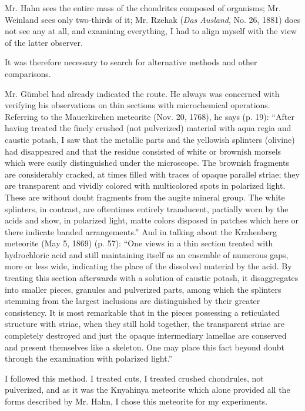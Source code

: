 \documentclass[a4paper, 12pt, oneside]{article}
\begin{document}
Mr. Hahn sees the entire mass of the chondrites composed of organisms; Mr. Weinland sees only two-thirds of it; Mr. Rzehak (\emph{Das Ausland}, No. 26, 1881) does not see any at all, and examining everything, I had to align myself with the view of the latter observer.

It was therefore necessary to search for alternative methods and other comparisons.

Mr. Gümbel had already indicated the route. He always was concerned with verifying his observations on thin sections with microchemical operations. Referring to the Mauerkirchen meteorite (Nov. 20, 1768), he says (p. 19): ``After having treated the finely crushed (not pulverized) material with aqua regia and caustic potash, I saw that the metallic parts and the yellowish splinters (olivine) had disappeared and that the residue consisted of white or brownish morsels which were easily distinguished under the microscope. The brownish fragments are considerably cracked, at times filled with traces of opaque parallel striae; they are transparent and vividly colored with multicolored spots in polarized light. These are without doubt fragments from the augite mineral group. The white splinters, in contrast, are oftentimes entirely translucent, partially worn by the acids and show, in polarized light, matte colors disposed in patches which here or there indicate banded arrangements.'' And in talking about the Krahenberg meteorite (May 5, 1869) (p. 57): ``One views in a thin section treated with hydrochloric acid and still maintaining itself as an ensemble of numerous gaps, more or less wide, indicating the place of the dissolved material by the acid. By treating this section afterwards with a solution of caustic potash, it disaggregates into smaller pieces, granules and pulverized parts, among which the splinters stemming from the largest inclusions are distinguished by their greater consistency. It is most remarkable that in the pieces possessing a reticulated structure with striae, when they still hold together, the transparent striae are completely destroyed and just the opaque intermediary lamellae are conserved and present themselves like a skeleton. One may place this fact beyond doubt through the examination with polarized light.''

I followed this method. I treated cuts, I treated crushed chondrules, not pulverized, and as it was the Knyahinya meteorite which alone provided all the forms described by Mr. Hahn, I chose this meteorite for my experiments.
\end{document}
